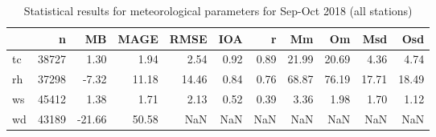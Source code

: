 \begin{table}
\centering
\caption{Statistical results for meteorological parameters for Sep-Oct 2018 (all stations)}
\label{tab:stats_all}
\begin{tabular}{lrrrrrrrrrr}
\toprule
{} &      n &     MB &   MAGE &   RMSE &   IOA &     r &     Mm &     Om &    Msd &    Osd \\
\midrule
tc &  38727 &   1.30 &   1.94 &   2.54 &  0.92 &  0.89 &  21.99 &  20.69 &   4.36 &   4.74 \\
rh &  37298 &  -7.32 &  11.18 &  14.46 &  0.84 &  0.76 &  68.87 &  76.19 &  17.71 &  18.49 \\
ws &  45412 &   1.38 &   1.71 &   2.13 &  0.52 &  0.39 &   3.36 &   1.98 &   1.70 &   1.12 \\
wd &  43189 & -21.66 &  50.58 &    NaN &   NaN &   NaN &    NaN &    NaN &    NaN &    NaN \\
\bottomrule
\end{tabular}
\end{table}

